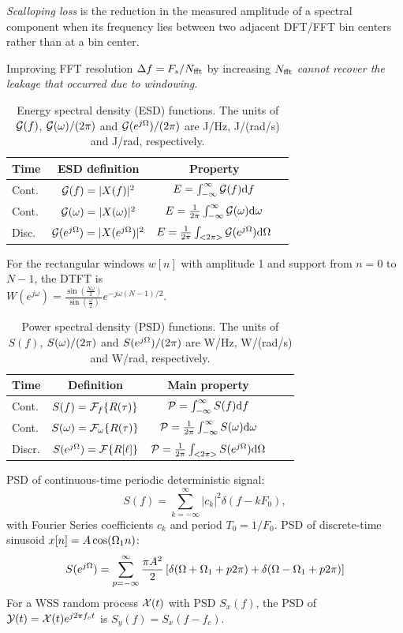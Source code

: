 \emph{Scalloping loss} is the reduction in the measured amplitude of a spectral component when its frequency lies between two adjacent DFT/FFT bin centers rather than at a bin center.

Improving FFT resolution $\Delta f = {F_s} / {N_{\textrm{fft}}}$ by increasing ${N_{\textrm{fft}}}$ \emph{cannot recover the leakage that occurred due to windowing}.

\begin{table}[h]
\caption{Energy spectral density (ESD) functions. 
The units of ${\cal G}(f)$, ${\cal G}({\omega})/(2 \pi)$ and ${\cal G}(e^{j{\Omega}})/(2 \pi)$ are J/Hz, J/(rad/s) and J/rad, respectively.\label{tab:esd_functions}}
\begin{tabular}{|l|c|c|c|}
\hline
Time  & ESD definition & Property \\ \hline
Cont. & ${\cal G}(f) = |X(f)|^2$ & $E=\int_{-\infty}^{\infty} {\cal G}(f) \textrm{d}f$  \\ \hline
Cont.& ${\cal G}({\omega}) = |X({\omega})|^2$ & $E=\frac{1}{2 \pi}\int_{-\infty}^{\infty} {\cal G}({\omega}) \textrm{d}{\omega}$  \\ \hline
Disc. & ${\cal G}(e^{j{\Omega}}) = |X(e^{j{\Omega}})|^2$ & $E=\frac{1}{2 \pi}\int_{<2 \pi>} {\cal G}(e^{j{\Omega}}) \textrm{d}{\Omega}$  \\ \hline
\end{tabular}
\end{table}

For the rectangular windows $w[n]$ with amplitude 1 and support from $n=0$ to $N-1$, the DTFT is\\
$W(e^{j \omega})=\frac{\sin \left( \frac{N\omega}{2} \right)}{\sin \left( \frac{\omega}{2}  \right)} e^{-j \omega (N-1)/2}$.

\begin{table}[h]
\centering
\caption{Power spectral density (PSD) functions. 
The units of $S(f)$, $S({\omega})/(2 \pi)$ and $S(e^{j{\Omega}})/(2 \pi)$ are W/Hz, W/(rad/s) and W/rad, respectively.\label{tab:psd_functions}}
\begin{tabular}{|l|c|c|c|c|}
\hline
Time &  Definition & Main property \\ \hline
Cont. &  $S(f) = {\cal F}_f \{ R(\tau) \}$ & ${\cal P} = \int_{- \infty}^\infty S(f) \textrm{d}f$  \\ \hline
Cont. &  $S({\omega}) = {\cal F}_{{\omega}} \{ R(\tau) \}$ & ${\cal P} = \frac{1}{2\pi} \int_{- \infty}^\infty S({\omega}) \textrm{d}{\omega}$  \\ \hline
Discr. &  $S(e^{j {\Omega}}) = {\cal F} \{ R[\ell] \}$ & ${\cal P} = \frac{1}{2 \pi}\int_{<2 \pi>} S(e^{j {\Omega}}) \textrm{d}{\Omega}$  \\ \hline
\end{tabular}
\end{table}
PSD of continuous-time periodic deterministic signal:
\begin{equation}
S(f) = \sum_{k=-\infty}^{\infty} |c_k|^2 \delta(f - k F_0),
\label{eq:psdOfPeriodicSignals}
\end{equation}
with Fourier Series coefficients $c_k$ and period $T_0=1/F_0$.
PSD of discrete-time sinusoid $x[n]=A\cos({\Omega}_1n)$:
\[
S(e^{j{\Omega}}) = \sum_{p=-\infty}^{\infty} \frac{\pi A^2}{2}\left[\delta({\Omega}+{\Omega}_1+p2\pi) + \delta({\Omega}-{\Omega}_1+p2\pi) \right]
\]
For a WSS random process ${\cal X}(t)$ with PSD $S_x(f)$, the PSD of ${\cal Y}(t) = {\cal X}(t) e^{j 2 \pi f_c t}$ is
$S_y(f) = S_x(f-f_c)$.


